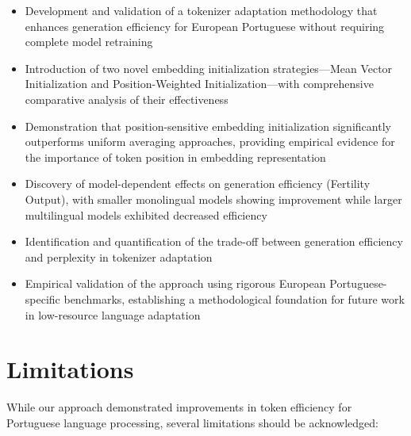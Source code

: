 \begin{itemize}
    \item Development and validation of a tokenizer adaptation methodology that enhances generation efficiency for European Portuguese without requiring complete model retraining
    
    \item Introduction of two novel embedding initialization strategies—Mean Vector Initialization and Position-Weighted Initialization—with comprehensive comparative analysis of their effectiveness
    
    \item Demonstration that position-sensitive embedding initialization significantly outperforms uniform averaging approaches, providing empirical evidence for the importance of token position in embedding representation
    
    \item Discovery of model-dependent effects on generation efficiency (Fertility Output), with smaller monolingual models showing improvement while larger multilingual models exhibited decreased efficiency
    
    \item Identification and quantification of the trade-off between generation efficiency and perplexity in tokenizer adaptation
    
    \item Empirical validation of the approach using rigorous European Portuguese-specific benchmarks, establishing a methodological foundation for future work in low-resource language adaptation
\end{itemize}

\section{Limitations}
While our approach demonstrated improvements in token efficiency for Portuguese language processing, several limitations should be acknowledged:

